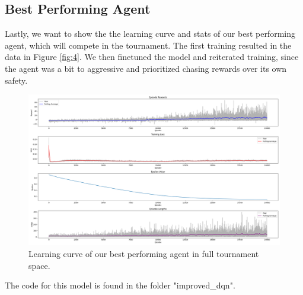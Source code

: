 \documentclass{article} %
\begin{document}
	\subsection{Best Performing Agent}
	Lastly, we want to show the the learning curve and stats of our best performing agent, which will compete in the tournament. 
	The first training resulted in the data in Figure \ref{fig:4}. We then finetuned the model and reiterated training, since the agent was a bit to aggressive and prioritized chasing rewards over its own safety. 
		\begin{figure}[h!]
		\centering
		\includegraphics[width=1.0\textwidth]{images/best_training_results}
		\caption{Learning curve of our best performing agent in full tournament space.}
		\label{fig:5}
	\end{figure}
	
	The code for this model is found in the folder "improved\_dqn".
	
	
	
\end{document}

